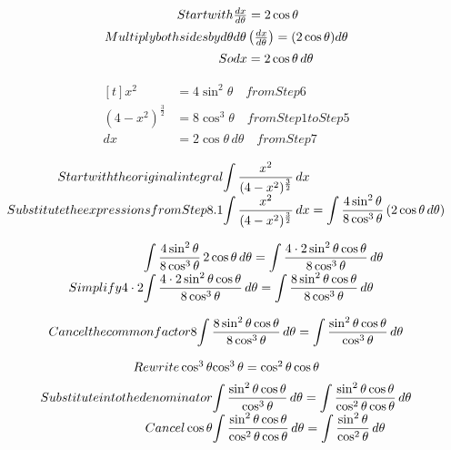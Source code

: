 \documentclass{article}
\begin{document}
\[
\begin{array}{@{}r@{}l@{}}
 Start with &
 \frac{dx}{d\theta}=2\cos\theta
 \\[1.2ex]
 Multiply both sides by d\theta
 &
 d\theta \left(\frac{dx}{d\theta}\right)
 =
 (2\cos\theta) d\theta \\[1.2ex]
 So &
 dx=2\cos\theta\, d\theta
 \end{array}
\]

\[
\begin{aligned}[t]
 x^2 &= 4\sin^2\theta \quad from Step 6 \\
 (4-x^2)^{\frac{3}{2}} &= 8\cos^3\theta \quad from Step 1 to Step 5 \\
 dx &= 2\cos\theta\, d\theta \quad from Step 7 \end{aligned}
\]

\[
\begin{array}{@{}r@{}l@{}}
 Start with the original integral &
 \displaystyle\int \frac{x^2}{(4-x^2)^{\frac{3}{2}}}\,dx
 \\[1.2ex]
 Substitute the expressions from Step 8.1 &
 \displaystyle\int \frac{x^2}{(4-x^2)^{\frac{3}{2}}}\,dx
 =
 \displaystyle\int
 \frac{ 4\sin^2\theta }{ 8\cos^3\theta }\,
 (2\cos\theta\, d\theta) \end{array}
\]

\[
\begin{array}{@{}r@{}l@{}}
 &
 \displaystyle\int \frac{4\sin^2\theta}{8\cos^3\theta}\, 2\cos\theta \, d\theta
 =
 \displaystyle\int \frac{4\cdot 2 \sin^2\theta \cos\theta }{8\cos^3\theta}\, d\theta
 \\[1.2ex]
 Simplify 4\cdot 2
 &
 \displaystyle\int \frac{4\cdot2\sin^2\theta\cos\theta}{8\cos^3\theta}\, d\theta
 =
 \displaystyle\int \frac{ 8 \sin^2\theta\cos\theta}{8\cos^3\theta}\, d\theta
 \end{array}
\]

\[
\begin{array}{@{}r@{}l@{}}
 Cancel the common factor 8
 &
 \displaystyle\int \frac{ 8 \sin^2\theta\cos\theta}{ 8 \cos^3\theta}\, d\theta
 =
 \displaystyle\int \frac{\sin^2\theta\cos\theta}{\cos^3\theta}\, d\theta
 \end{array}
\]

\[
\begin{array}{@{}r@{}l@{}}
 Rewrite \cos^3\theta
 &
 \cos^3\theta=\cos^2\theta\cos\theta
 \\[1.2ex]
 Substitute into the denominator &
 \displaystyle\int \frac{\sin^2\theta\cos\theta}{ \cos^3\theta }\, d\theta
 =
 \displaystyle\int \frac{\sin^2\theta\cos\theta}{ \cos^2\theta\cos\theta }\, d\theta
 \\[1.2ex]
 Cancel \cos\theta
 &
 \displaystyle\int \frac{\sin^2\theta \cos\theta }{\cos^2\theta \cos\theta }\, d\theta
 =
 \displaystyle\int \frac{\sin^2\theta}{\cos^2\theta}\, d\theta
 \end{array}
\]
\end{document}
